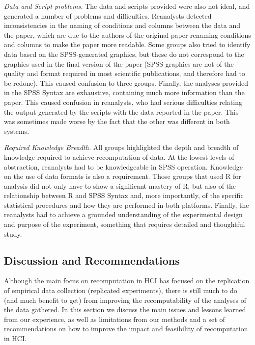 \emph{Data and Script problems.} The data and scripts provided were also not ideal, and generated a number of problems and difficulties. Reanalysts detected inconsistencies in the naming of conditions and columns between the data and the paper, which are due to the authors of the original paper renaming conditions and columns to make the paper more readable. Some groups also tried to identify data based on the SPSS-generated graphics, but these do not correspond to the graphics used in the final version of the paper (SPSS graphics are not of the quality and format required in most scientific publications, and therefore had to be redone). This caused confusion to three groups. Finally, the analyses provided in the SPSS Syntax are exhaustive, containing much more information than the paper. This caused confusion in reanalysts, who had serious difficulties relating the output generated by the scripts with the data reported in the paper. This was sometimes made worse by the fact that the other was different in both systems.

\emph{Required Knowledge Breadth.} All groups highlighted the depth and breadth of knowledge required to achieve recomputation of data. At the lowest levels of abstraction, reanalysts had to be knowledgeable in SPSS operation. Knowledge on the use of data formats is also a requirement. Those groups that used R for analysis did not only have to show a significant mastery of R, but also of the relationship between R and SPSS Syntax and, more importantly, of the specific statistical procedures and how they are performed in both platforms. Finally, the reanalysts had to achieve a grounded understanding of the experimental design and purpose of the experiment, something that requires detailed and thoughtful study.

\subsection{Discussion and Recommendations}
Although the main focus on recomputation in HCI has focused on the replication of empirical data collection (replicated experiments), there is still much to do (and much benefit to get) from improving the recomputability of the analyses of the data gathered. In this section we discuss the main issues and lessons learned from our experience, as well as limitations from our methods and a set of recommendations on how to improve the impact and feasibility of recomputation in HCI.

